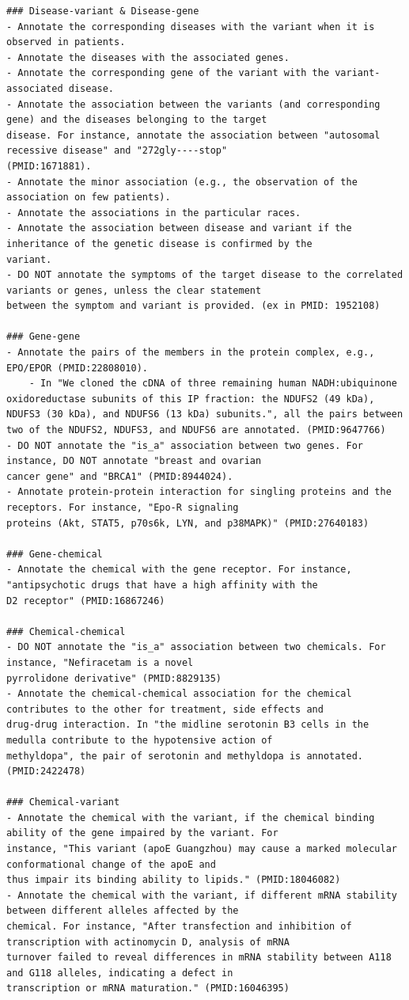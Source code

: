 \begin{lstlisting}
### Disease-variant & Disease-gene
- Annotate the corresponding diseases with the variant when it is observed in patients.
- Annotate the diseases with the associated genes.
- Annotate the corresponding gene of the variant with the variant-associated disease.
- Annotate the association between the variants (and corresponding gene) and the diseases belonging to the target
disease. For instance, annotate the association between "autosomal recessive disease" and "272gly----stop"
(PMID:1671881).
- Annotate the minor association (e.g., the observation of the association on few patients).
- Annotate the associations in the particular races.
- Annotate the association between disease and variant if the inheritance of the genetic disease is confirmed by the
variant.
- DO NOT annotate the symptoms of the target disease to the correlated variants or genes, unless the clear statement
between the symptom and variant is provided. (ex in PMID: 1952108)

### Gene-gene
- Annotate the pairs of the members in the protein complex, e.g., EPO/EPOR (PMID:22808010).
    - In "We cloned the cDNA of three remaining human NADH:ubiquinone oxidoreductase subunits of this IP fraction: the NDUFS2 (49 kDa), NDUFS3 (30 kDa), and NDUFS6 (13 kDa) subunits.", all the pairs between two of the NDUFS2, NDUFS3, and NDUFS6 are annotated. (PMID:9647766)
- DO NOT annotate the "is_a" association between two genes. For instance, DO NOT annotate "breast and ovarian
cancer gene" and "BRCA1" (PMID:8944024).
- Annotate protein-protein interaction for singling proteins and the receptors. For instance, "Epo-R signaling
proteins (Akt, STAT5, p70s6k, LYN, and p38MAPK)" (PMID:27640183)

### Gene-chemical
- Annotate the chemical with the gene receptor. For instance, "antipsychotic drugs that have a high affinity with the
D2 receptor" (PMID:16867246)

### Chemical-chemical
- DO NOT annotate the "is_a" association between two chemicals. For instance, "Nefiracetam is a novel
pyrrolidone derivative" (PMID:8829135)
- Annotate the chemical-chemical association for the chemical contributes to the other for treatment, side effects and
drug-drug interaction. In "the midline serotonin B3 cells in the medulla contribute to the hypotensive action of
methyldopa", the pair of serotonin and methyldopa is annotated. (PMID:2422478)

### Chemical-variant
- Annotate the chemical with the variant, if the chemical binding ability of the gene impaired by the variant. For
instance, "This variant (apoE Guangzhou) may cause a marked molecular conformational change of the apoE and
thus impair its binding ability to lipids." (PMID:18046082)
- Annotate the chemical with the variant, if different mRNA stability between different alleles affected by the
chemical. For instance, "After transfection and inhibition of transcription with actinomycin D, analysis of mRNA
turnover failed to reveal differences in mRNA stability between A118 and G118 alleles, indicating a defect in
transcription or mRNA maturation." (PMID:16046395)


\end{lstlisting}
